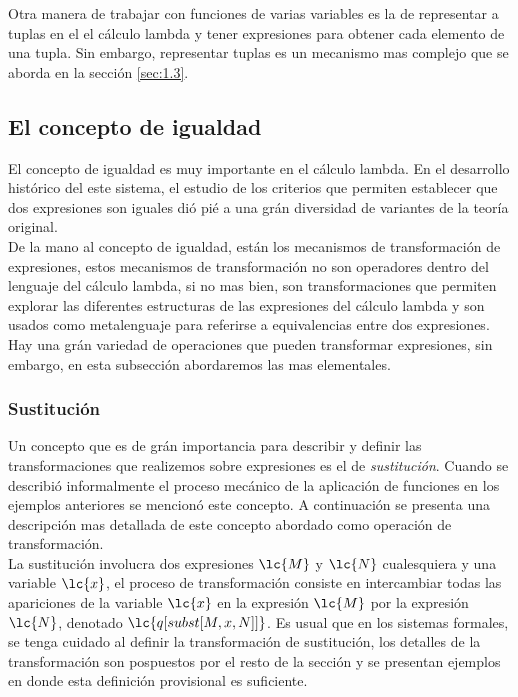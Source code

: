 Otra manera de trabajar con funciones de varias variables es la de representar a
tuplas en el el cálculo lambda y tener expresiones para obtener cada elemento de
una tupla. Sin embargo, representar tuplas es un mecanismo mas complejo que se
aborda en la sección \ref{sec:1.3}.\\

\subsection{El concepto de igualdad} \label{sec:1.1.2}

El concepto de igualdad es muy importante en el cálculo lambda. En el
desarrollo histórico del este sistema, el estudio de los criterios que permiten
establecer que dos expresiones son iguales dió pié a una grán diversidad de
variantes de la teoría original.\\

De la mano al concepto de igualdad, están los mecanismos de transformación de
expresiones, estos mecanismos de transformación no son operadores dentro del
lenguaje del cálculo lambda, si no mas bien, son transformaciones que permiten
explorar las diferentes estructuras de las expresiones del cálculo lambda y son
usados como metalenguaje para referirse a equivalencias entre dos expresiones.
Hay una grán variedad de operaciones que pueden transformar expresiones, sin
embargo, en esta subsección abordaremos las mas elementales.\\

\subsubsection{Sustitución}

Un concepto que es de grán importancia para describir y definir las
transformaciones que realizemos sobre expresiones es el de \emph{sustitución}.
Cuando se describió informalmente el proceso mecánico de la aplicación de
funciones en los ejemplos anteriores se mencionó este concepto. A continuación
se presenta una descripción mas detallada de este concepto abordado como
operación de transformación. \\

La sustitución involucra dos expresiones \(\lc{M}\) y \(\lc{N}\) cualesquiera y una
variable \(\lc{x}\), el proceso de transformación consiste en intercambiar todas las
apariciones de la variable \(\lc{x}\) en la expresión \(\lc{M}\) por la expresión \(\lc{N}\),
denotado \(\lc{q[subst[M,x,N]]}\). Es usual que en los sistemas formales, se tenga
cuidado al definir la transformación de sustitución, los detalles de la
transformación son pospuestos por el resto de la sección y se presentan ejemplos
en donde esta definición provisional es suficiente. \\

